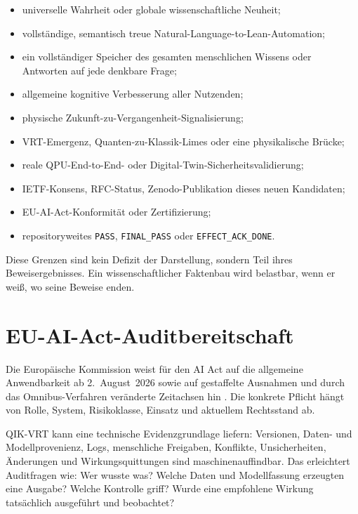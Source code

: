 \documentclass[11pt,a4paper,oneside]{article}
\newcommand{\code}[1]{\texttt{#1}}
\begin{document}
\begin{openbox}
\begin{itemize}
  \item universelle Wahrheit oder globale wissenschaftliche Neuheit;
  \item vollständige, semantisch treue Natural-Language-to-Lean-Automation;
  \item ein vollständiger Speicher des gesamten menschlichen Wissens oder
  Antworten auf jede denkbare Frage;
  \item allgemeine kognitive Verbesserung aller Nutzenden;
  \item physische Zukunft-zu-Vergangenheit-Signalisierung;
  \item VRT-Emergenz, Quanten-zu-Klassik-Limes oder eine physikalische Brücke;
  \item reale QPU-End-to-End- oder Digital-Twin-Sicherheitsvalidierung;
  \item IETF-Konsens, RFC-Status, Zenodo-Publikation dieses neuen Kandidaten;
  \item EU-AI-Act-Konformität oder Zertifizierung;
  \item repositoryweites \code{PASS}, \code{FINAL\_PASS} oder
  \code{EFFECT\_ACK\_DONE}.
\end{itemize}
\end{openbox}

Diese Grenzen sind kein Defizit der Darstellung, sondern Teil ihres
Beweisergebnisses. Ein wissenschaftlicher Faktenbau wird belastbar, wenn er
weiß, wo seine Beweise enden.

\section{EU-AI-Act-Auditbereitschaft}

Die Europäische Kommission weist für den AI Act auf die allgemeine
Anwendbarkeit ab 2.~August~2026 sowie auf gestaffelte Ausnahmen und durch das
Omnibus-Verfahren veränderte Zeitachsen hin \cite{EUAIActNavigation2026}. Die
konkrete Pflicht hängt von Rolle, System, Risikoklasse, Einsatz und aktuellem
Rechtsstand ab.

QIK-VRT kann eine technische Evidenzgrundlage liefern: Versionen, Daten- und
Modellprovenienz, Logs, menschliche Freigaben, Konflikte, Unsicherheiten,
Änderungen und Wirkungsquittungen sind maschinenauffindbar. Das erleichtert
Auditfragen wie: Wer wusste was? Welche Daten und Modellfassung erzeugten eine
Ausgabe? Welche Kontrolle griff? Wurde eine empfohlene Wirkung tatsächlich
ausgeführt und beobachtet?
\end{document}
